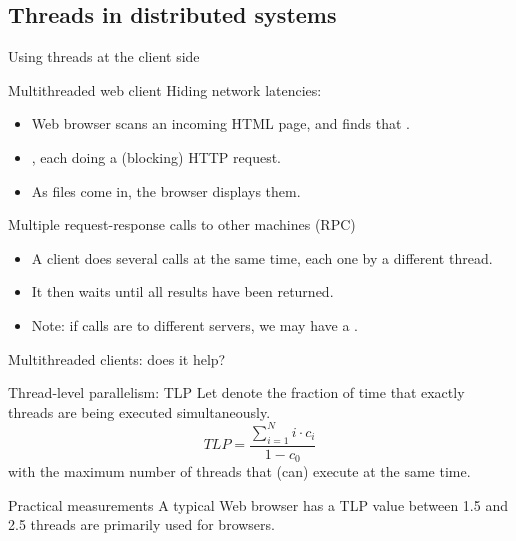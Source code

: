 \subsection{Threads in distributed systems}
\begin{slide}{Using threads at the client side}
  \begin{block}{Multithreaded web client}
    Hiding network latencies:
    \begin{itemize}\tightlist
    \item Web browser scans an incoming HTML page, and finds that .
    \item {}, each doing a (blocking) HTTP request.
    \item As files come in, the browser displays them.
    \end{itemize}
  \end{block}
  \begin{block}{Multiple request-response calls to other machines (RPC)}
    \begin{itemize}\tightlist
    \item A client does several calls at the same time, each one by a different thread.
    \item It then waits until all results have been returned.
    \item Note: if calls are to different servers, we may have a .
    \end{itemize}
  \end{block}
\end{slide}
  \begin{slide}{Multithreaded clients: does it help?}
    \begin{block}{Thread-level parallelism: TLP}
      Let  denote the fraction of time that exactly  threads are being executed
      simultaneously.
      \[ TLP = \frac{\sum_{i=1}^N i \cdot c_i}{1- c_0} \]
      with  the maximum number of threads that (can) execute at the same time. 
    \end{block}
    \onslide
    \begin{block}{Practical measurements}
      A typical Web browser has a TLP value between 1.5 and 2.5 \mathexpr{\Rightarrow} threads are primarily
      used for  browsers.
    \end{block}
  \end{slide}
